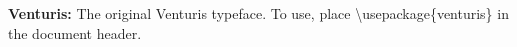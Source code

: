 \documentclass{article}
\begin{document}
\frenchspacing

\begin{description}

\item{\bf Venturis:}
The original Venturis typeface. To use, place \textbackslash usepackage\{venturis\}
in the document header.
\end{description}
\end{document}
